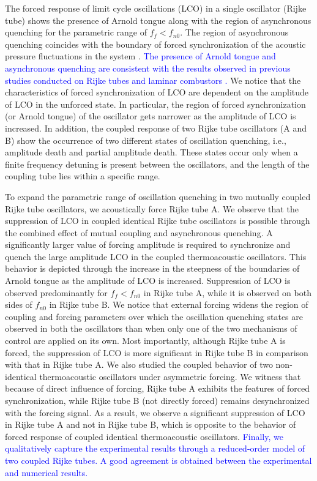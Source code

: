 \documentclass[%
preprint,
 amsmath,amssymb,
 aps,
 pra,
]{revtex4-2}
\begin{document}
The forced response of limit cycle oscillations (LCO) in a single oscillator (Rijke tube) shows the presence of Arnold tongue along with the region of asynchronous quenching for the parametric range of $f_f<f_{n0}$. The region of asynchronous quenching coincides with the boundary of forced synchronization of the acoustic pressure fluctuations in the system \cite{mondal2019forced}. \textcolor{blue}{The presence of Arnold tongue and asynchronous quenching are consistent with the results observed in previous studies conducted on Rijke tubes \cite{mondal2019forced} and laminar combustors \cite{guan2019open, roy2020mechanism, guan2019forced}.} We notice that the characteristics of forced synchronization of LCO are dependent on the amplitude of LCO in the unforced state. In particular, the region of forced synchronization (or Arnold tongue) of the oscillator gets narrower as the amplitude of LCO is increased. In addition, the coupled response of two Rijke tube oscillators (A and B) show the occurrence of two different states of oscillation quenching, i.e., amplitude death and partial amplitude death. These states occur only when a finite frequency detuning is present between the oscillators, and the length of the coupling tube lies within a specific range.

To expand the parametric range of oscillation quenching in two mutually coupled Rijke tube oscillators, we acoustically force Rijke tube A. We observe that the suppression of LCO in coupled identical Rijke tube oscillators is possible through the combined effect of mutual coupling and asynchronous quenching. A significantly larger value of forcing amplitude is required to synchronize and quench the large amplitude LCO in the coupled thermoacoustic oscillators. This behavior is depicted through the increase in the steepness of the boundaries of Arnold tongue as the amplitude of LCO is increased. Suppression of LCO is observed predominantly for $f_f<f_{n0}$ in Rijke tube A, while it is observed on both sides of $f_{n0}$ in Rijke tube B. We notice that external forcing widens the region of coupling and forcing parameters over which the oscillation quenching states are observed in both the oscillators than when only one of the two mechanisms of control are applied on its own. Most importantly, although Rijke tube A is forced, the suppression of LCO is more significant in Rijke tube B in comparison with that in Rijke tube A. We also studied the coupled behavior of two non-identical thermoacoustic oscillators under asymmetric forcing. We witness that because of direct influence of forcing, Rijke tube A exhibits the features of forced synchronization, while Rijke tube B (not directly forced) remains desynchronized with the forcing signal. As a result, we observe a significant suppression of LCO in Rijke tube A and not in Rijke tube B, which is opposite to the behavior of forced response of coupled identical thermoacoustic oscillators. \textcolor{blue}{Finally, we qualitatively capture the experimental results through a reduced-order model of two coupled Rijke tubes. A good agreement is obtained between the experimental and numerical results.}
\end{document}
